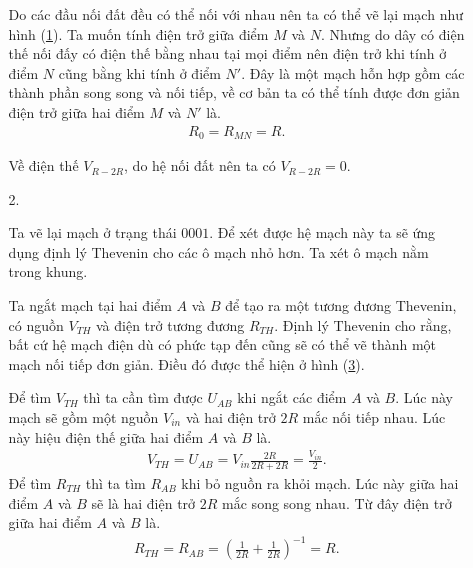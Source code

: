 \begin{center}
\begin{enumerate}[label=(\alph*)]
\begin{enumerate}
    Do các đầu nối đất đều có thể nối với nhau nên ta có thể vẽ lại mạch như hình (\ref{S3.Hình 1}). Ta muốn tính điện trở giữa điểm $M$ và $N$. Nhưng do dây có điện thế nối đấy có điện thế bằng nhau tại mọi điểm nên điện trở khi tính ở điểm $N$ cũng bằng khi tính ở điểm $N'$. Đây là một mạch hỗn hợp gồm các thành phần song song và nối tiếp, về cơ bản ta có thể tính được đơn giản điện trở giữa hai điểm $M$ và $N'$ là.
    \begin{align}
        R_0 = R_{MN}= R.
        \label{eq:67}
    \end{align}
    
    \begin{figure}[!h]
        \centering
        
        \caption{}
        \label{S3.Hình 1}
    \end{figure}
    
    Về điện thế $V_{R-2R}$, do hệ nối đất nên ta có $V_{R-2R}=0$.
\item[2.]
    
    Ta vẽ lại mạch ở trạng thái $0001$. Để xét được hệ mạch này ta sẽ ứng dụng định lý Thevenin cho các ô mạch nhỏ hơn. Ta xét ô mạch nằm trong khung.
    
    \begin{figure}[!h]
        \centering
        
        \caption{}
        \label{S3.Hình 2}
    \end{figure}

    Ta ngắt mạch tại hai điểm $A$ và $B$ để tạo ra một tương đương Thevenin, có nguồn $V_{TH}$ và điện trở tương đương $R_{TH}$. Định lý Thevenin cho rằng, bất cứ hệ mạch điện dù có phức tạp đến cũng sẽ có thể vẽ thành một mạch nối tiếp đơn giản.
    Điều đó được thể hiện ở hình (\ref{S3.Hình 3}). 
    
    \begin{figure}[h]
        \centering
        
        \caption{}
        \label{S3.Hình 3}
    \end{figure}

    Để tìm $V_{TH}$ thì ta cần tìm được $U_{AB}$ khi ngắt các điểm $A$ và $B$. Lúc này mạch sẽ gồm một nguồn $V_{in}$ và hai điện trở $2R$ mắc nối tiếp nhau. Lúc này hiệu điện thế giữa hai điểm $A$ và $B$ là.
    \begin{align}
        V_{TH}= U_{AB} = V_{in} \frac{2R}{2R+2R} = \frac{V_{in}}{2}.
        \label{eq:68}
    \end{align}
    Để tìm $R_{TH}$ thì ta tìm $R_{AB}$ khi bỏ nguồn ra khỏi mạch. Lúc này giữa hai điểm $A$ và $B$ sẽ là hai điện trở $2R$ mắc song song nhau. Từ đây điện trở giữa hai điểm $A$ và $B$ là.
    \begin{align}
        R_{TH}=R_{AB}= \left(\frac{1}{2R} + \frac{1}{2R} \right)^{-1} = R.
        \label{eq:69}
    \end{align}


\end{enumerate}
\end{enumerate}
\end{center}
